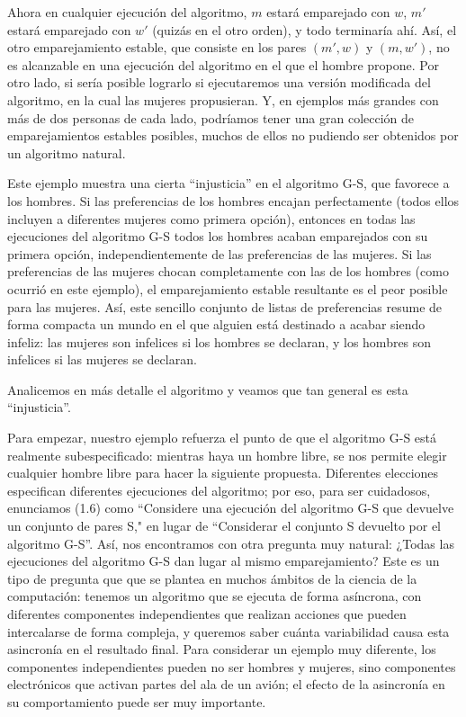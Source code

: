 \documentclass[a4paper, 12pt]{book}
\theoremstyle{dotless}
\begin{document}
Ahora en cualquier ejecución del algoritmo, $m$ estará emparejado con $w$, $m'$ estará emparejado con $w'$ (quizás en el otro orden), y todo terminaría ahí. Así, el otro emparejamiento estable, que consiste en los pares $(m',w)$ y $(m,w')$, no es alcanzable en una ejecución del algoritmo en el que el hombre propone. Por otro lado, si sería posible lograrlo si ejecutaremos una versión modificada del algoritmo, en la cual las mujeres propusieran. Y, en ejemplos más grandes con más de dos personas de cada lado, podríamos tener una gran colección de emparejamientos estables posibles, muchos de ellos no pudiendo ser obtenidos por un algoritmo natural.

Este ejemplo muestra una cierta ``injusticia'' en el algoritmo G-S, que favorece a los hombres. Si las preferencias de los hombres encajan perfectamente (todos ellos incluyen a diferentes mujeres como primera opción), entonces en todas las ejecuciones del algoritmo G-S todos los hombres acaban emparejados
con su primera opción, independientemente de las preferencias de las mujeres. Si las preferencias de las mujeres chocan completamente con las de los hombres (como ocurrió en este ejemplo), el emparejamiento estable resultante es el peor posible para las mujeres. Así, este sencillo conjunto de listas de preferencias resume de forma compacta un mundo en el que alguien está destinado a acabar siendo infeliz: las mujeres son infelices si los hombres se declaran, y los hombres son infelices si las mujeres se declaran.

Analicemos en más detalle el algoritmo y veamos que tan general es esta ``injusticia''.

Para empezar, nuestro ejemplo refuerza el punto de que el algoritmo G-S está realmente subespecificado: mientras haya un hombre libre, se nos permite elegir cualquier hombre libre para hacer la siguiente propuesta. Diferentes elecciones especifican diferentes ejecuciones del algoritmo; por eso, para ser cuidadosos, enunciamos (1.6) como ``Considere una ejecución del algoritmo G-S que devuelve un conjunto de pares S," en lugar de ``Considerar el conjunto S devuelto por el algoritmo G-S''. Así, nos encontramos con otra pregunta muy natural: ¿Todas las ejecuciones del algoritmo G-S dan lugar al mismo emparejamiento? Este es un tipo de pregunta que que se plantea en muchos ámbitos de la ciencia de la computación: tenemos un algoritmo que se ejecuta de forma asíncrona, con diferentes componentes independientes que realizan acciones que pueden intercalarse de forma compleja, y queremos saber cuánta variabilidad causa esta asincronía en el resultado final. Para considerar un ejemplo muy diferente, los componentes independientes pueden no ser hombres y mujeres, sino componentes electrónicos que activan partes del ala de un avión; el efecto de la asincronía en su comportamiento puede ser muy importante.
\end{document}
